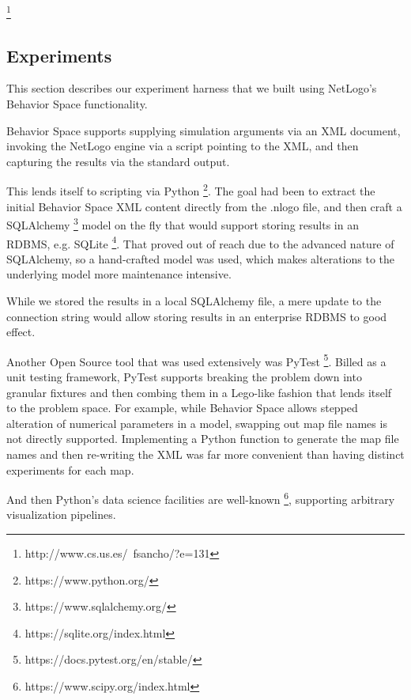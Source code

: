 \documentclass[12pt,letterpaper]{article}
\begin{document}
\cite{mirahmadiNovelAlgorithmRealtime2012}
\footnote{http://www.cs.us.es/~fsancho/?e=131}

\subsection{Experiments}

This section describes our experiment harness that we built using NetLogo's
Behavior Space functionality.

Behavior Space supports supplying simulation arguments via an XML document,
invoking the NetLogo engine via a script pointing to the XML, and then capturing
the results via the standard output.

This lends itself to scripting via Python \footnote{https://www.python.org/}. The goal had been to extract the
initial Behavior Space XML content directly from the .nlogo file, and then craft
a SQLAlchemy \footnote{https://www.sqlalchemy.org/} model on the fly that would support storing results in an RDBMS,
e.g. SQLite \footnote{https://sqlite.org/index.html}. That proved out of reach due to the advanced nature of SQLAlchemy,
so a hand-crafted model was used, which makes alterations to the underlying
model more maintenance intensive.

While we stored the results in a local SQLAlchemy file, a mere update to the
connection string would allow storing results in an enterprise RDBMS to good
effect.

Another Open Source tool that was used extensively was PyTest \footnote{https://docs.pytest.org/en/stable/}. Billed as a
unit testing framework, PyTest supports breaking the problem down into granular
fixtures and then combing them in a Lego-like fashion that lends itself to the
problem space. For example, while Behavior Space allows stepped alteration of
numerical parameters in a model, swapping out map file names is not directly
supported. Implementing a Python function to generate the map file names and
then re-writing the XML was far more convenient than having distinct
experiments for each map.

And then Python's data science facilities are well-known \footnote{https://www.scipy.org/index.html}, supporting arbitrary
visualization pipelines.
\end{document}
